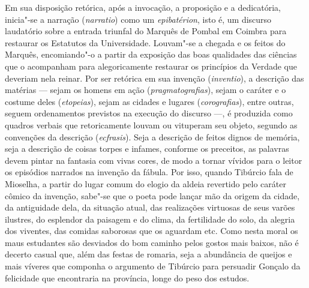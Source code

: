 Em sua disposição retórica, após a invocação, a proposição e a dedicatória,
inicia"-se a narração (\textit{narratio}) como um \textit{epibatérion}, isto é,
um discurso laudatório sobre a entrada triunfal do Marquês de Pombal em Coimbra
para restaurar os Estatutos da Universidade.  Louvam"-se a chegada e os feitos do
Marquês, encomiando"-o a partir da exposição das boas qualidades das ciências que
o acompanham para alegoricamente restaurar os princípios da Verdade que deveriam
nela reinar. Por ser retórica em sua invenção (\textit{inventio}), a descrição
das matérias --- sejam os homens em ação (\textit{pragmatografias}), sejam o
caráter e o costume deles (\textit{etopeias}), sejam as cidades e lugares
(\textit{corografias}), entre outras, seguem ordenamentos previstos na execução
do discurso ---, é produzida como quadros verbais que retoricamente louvam ou
vituperam seu objeto, segundo as convenções da descrição (\textit{ecfrasis}).
Seja a descrição de feitos dignos de memória, seja a descrição de coisas torpes
e infames, conforme os preceitos, as palavras devem pintar na fantasia com vivas
cores, de modo a tornar vívidos para o leitor os episódios narrados na invenção
da fábula.  Por isso, quando Tibúrcio fala de Mioselha, a partir do lugar comum
do elogio da aldeia revertido pelo caráter cômico da invenção, sabe"-se que o
poeta pode lançar mão da origem da cidade, da antiguidade dela, da situação
atual, das realizações virtuosas de seus varões ilustres, do esplendor da
paisagem e do clima, da fertilidade do solo, da alegria dos viventes, das
comidas saborosas que os aguardam etc. Como nesta moral os maus estudantes são
desviados do bom caminho pelos gostos mais baixos, não é decerto casual que, além
das festas de romaria, seja a abundância de queijos e mais víveres que componha
o argumento de Tibúrcio para persuadir Gonçalo da felicidade que encontraria na
província, longe do peso dos estudos.


